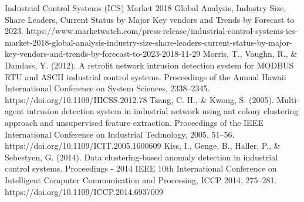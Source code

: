 \documentclass[conference]{IEEEtran}
\begin{document}
\begin{thebibliography}{00}
Industrial Control Systems (ICS) Market 2018 Global Analysis, Industry Size, Share Leaders, Current Status by Major Key vendors and Trends by Forecast to 2023. https://www.marketwatch.com/press-release/industrial-control-systems-ics-market-2018-global-analysis-industry-size-share-leaders-current-status-by-major-key-vendors-and-trends-by-forecast-to-2023-2018-11-29
Morris, T., Vaughn, R., \& Dandass, Y. (2012). A retrofit network intrusion detection system for MODBUS RTU and ASCII industrial control systems. Proceedings of the Annual Hawaii International Conference on System Sciences, 2338–2345. https://doi.org/10.1109/HICSS.2012.78
Tsang, C. H., \& Kwong, S. (2005). Multi-agent intrusion detection system in industrial network using ant colony clustering approach and unsupervised feature extraction. Proceedings of the IEEE International Conference on Industrial Technology, 2005, 51–56. https://doi.org/10.1109/ICIT.2005.1600609
Kiss, I., Genge, B., Haller, P., & Sebestyen, G. (2014). Data clustering-based anomaly detection in industrial control systems. Proceedings - 2014 IEEE 10th International Conference on Intelligent Computer Communication and Processing, ICCP 2014, 275–281. https://doi.org/10.1109/ICCP.2014.6937009
\end{thebibliography}
\vspace{12pt}
\end{document}
